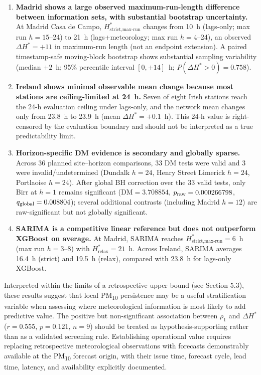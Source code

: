 \documentclass[12pt,a4paper]{article}
\newcommand{\PMten}{PM\textsubscript{10}}
\begin{document}
\begin{enumerate}
  \item \textbf{Madrid shows a large observed maximum-run-length difference
    between information sets, with substantial bootstrap uncertainty.}  At
    Madrid Casa de Campo, $H^*_{\text{strict,max-run}}$ changes from 10~h
    (lags-only; max run $h=15$--24) to 21~h (lags+meteorology; max run
    $h=4$--24), an observed $\Delta H^*=+11$ in maximum-run length (not an
    endpoint extension).  A paired timestamp-safe moving-block bootstrap shows
    substantial sampling variability (median $+2$~h; 95\% percentile interval
    $[0,+14]$~h; $P(\Delta H^*>0)=0.758$).

  \item \textbf{Ireland shows minimal observable mean change because most
    stations are ceiling-limited at 24~h.}  Seven of eight Irish stations reach
    the 24-h evaluation ceiling under lags-only, and the network mean changes
    only from 23.8~h to 23.9~h (mean $\Delta H^*=+0.1$~h).  This 24-h value is
    right-censored by the evaluation boundary and should not be interpreted as
    a true predictability limit.

  \item \textbf{Horizon-specific DM evidence is secondary and globally sparse.}
    Across 36 planned site--horizon comparisons, 33 DM tests were valid and 3
    were invalid/undetermined (Dundalk $h=24$, Henry Street Limerick $h=24$,
    Portlaoise $h=24$).  After global BH correction over the 33 valid tests,
    only Birr at $h=1$ remains significant (DM$=3.708854$,
    $p_{\rm raw}=0.000266798$, $q_{\rm global}=0.008804$); several additional
    contrasts (including Madrid $h=12$) are raw-significant but not globally
    significant.

  \item \textbf{SARIMA is a competitive linear reference but does not
    outperform XGBoost on average.}  At Madrid, SARIMA reaches
    $H^*_{\text{strict,max-run}}=6$~h (max run $h=3$--8) with
    $H^*_{\text{relax}}=21$~h.  Across Ireland, SARIMA averages 16.4~h (strict)
    and 19.5~h (relax), compared with 23.8~h for lags-only XGBoost.
\end{enumerate}

Interpreted within the limits of a retrospective upper bound (see Section 5.3),
these results suggest that local \PMten{} persistence may be a useful
stratification variable when assessing where meteorological information is most
likely to add predictive value.  The positive but non-significant association
between $\rho_1$ and $\Delta H^*$ ($r=0.555$, $p=0.121$, $n=9$) should be treated
as hypothesis-supporting rather than as a validated screening rule.
Establishing operational value requires replacing retrospective meteorological
observations with forecasts demonstrably available at the \PMten{} forecast
origin, with their issue time, forecast cycle, lead time, latency, and
availability explicitly documented.
\end{document}
